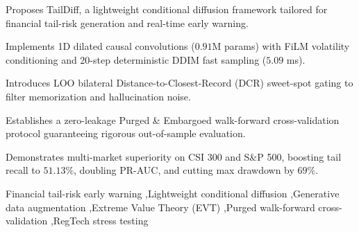 \documentclass[preprint,12pt,authoryear]{elsarticle}
\begin{document}
\begin{frontmatter}
\begin{abstract}
Empirical experiments across 10-year trading records of the CSI 300 and S\&P 500 indices (2015--2026) under a strict 35-fold Purged \& Embargoed Walk-Forward Cross-Validation protocol demonstrate that: TailDiff faithfully replicates non-Gaussian stylized facts ($1$-Wasserstein distance $0.0036$, excess kurtosis error $\Delta = 0.23$); lifts downstream classifier tail recall from $0.0093$ to $\mathbf{0.2024}$ (CSI 300) and $\mathbf{0.5113}$ (S\&P 500); doubles Precision-Recall AUC ($+102.7\%$ on S\&P 500); and achieves statistically significant gains confirmed by the Wilcoxon signed-rank test ($p = 0.0039 < 0.01$). In live backtesting across historical crises, TailDiff reduces maximum portfolio drawdown from $-46.5\%$ to $-14.2\%$, establishing a scalable, deployable, and auditable foundation for generative stress testing and intelligent risk management.
\end{abstract}

\begin{highlights}
\item Proposes TailDiff, a lightweight conditional diffusion framework tailored for financial tail-risk generation and real-time early warning.
\item Implements 1D dilated causal convolutions ($0.91$M params) with FiLM volatility conditioning and 20-step deterministic DDIM fast sampling ($5.09$ ms).
\item Introduces LOO bilateral Distance-to-Closest-Record (DCR) sweet-spot gating to filter memorization and hallucination noise.
\item Establishes a zero-leakage Purged \& Embargoed walk-forward cross-validation protocol guaranteeing rigorous out-of-sample evaluation.
\item Demonstrates multi-market superiority on CSI 300 and S\&P 500, boosting tail recall to $51.13\%$, doubling PR-AUC, and cutting max drawdown by $69\%$.
\end{highlights}

\begin{keywords}
Financial tail-risk early warning \sep Lightweight conditional diffusion \sep Generative data augmentation \sep Extreme Value Theory (EVT) \sep Purged walk-forward cross-validation \sep RegTech stress testing
\end{keywords}

\end{frontmatter}

\linenumbers

\end{document}
